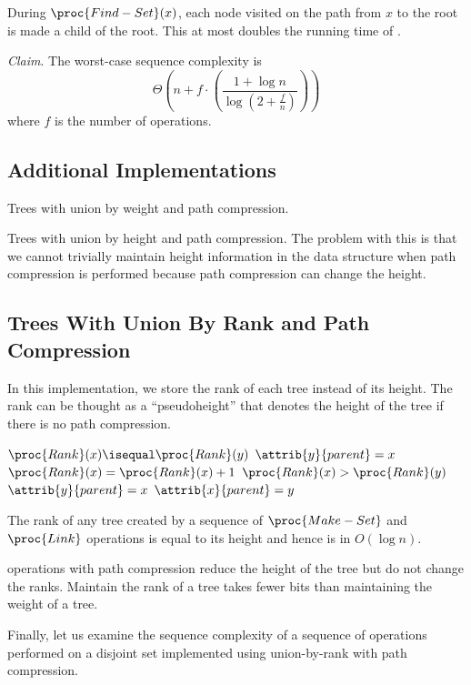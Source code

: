 During $\proc{Find-Set}(x)$, each node visited on the path from $x$ to the root is made a child of the root. This at most doubles the running time of .

\textit{Claim}. The worst-case sequence complexity is 
$$
\Theta \left( n + f \cdot \left( \frac{1+ \log n}{\log (2 + \frac{f}{n})} \right) \right)
$$
where $f$ is the number of  operations.

\subsection{Additional Implementations}

Trees with union by weight and path compression. 

Trees with union by height and path compression. The problem with this is that we cannot trivially maintain height information in the data structure when path compression is performed because path compression can change the height.

\subsection{Trees With Union By Rank and Path Compression}

In this implementation, we store the rank of each tree instead of its height. The rank can be thought as a ``pseudoheight'' that denotes the height of the tree if there is no path compression.

\begin{codebox}
    \li \If $\proc{Rank}(x) \isequal \proc{Rank}(y)$ \Then
        \li $\attrib{y}{parent} = x$
        \li $\proc{Rank}(x) = \proc{Rank}(x) + 1$
    \li \ElseIf  $\proc{Rank}(x) > \proc{Rank}(y)$ \Then
        \li $\attrib{y}{parent} = x$
    \li \Else
        \li $\attrib{x}{parent} = y$
\end{codebox}

The rank of any tree created by a sequence of $\proc{Make-Set}$ and $\proc{Link}$ operations is equal to its height and hence is in $O(\log n)$.

 operations with path compression reduce the height of the tree but do not change the ranks. Maintain the rank of a tree takes fewer bits than maintaining the weight of a tree.

Finally, let us examine the sequence complexity of a sequence of operations performed on a disjoint set implemented using union-by-rank with path compression.

